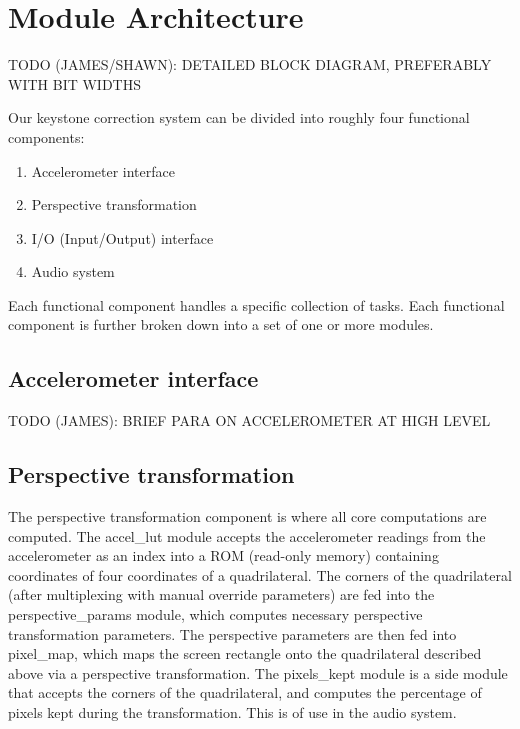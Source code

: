 \documentclass{article}
\begin{document}
\section{Module Architecture}
TODO (JAMES/SHAWN): DETAILED BLOCK DIAGRAM, PREFERABLY WITH BIT WIDTHS

Our keystone correction system can be divided into roughly four functional components:
\begin{enumerate}
\item Accelerometer interface
\item Perspective transformation
\item I/O (Input/Output) interface
\item Audio system
\end{enumerate}

Each functional component handles a specific collection of tasks. Each functional component is further broken down into a set of one or more modules. 

\subsection{Accelerometer interface}
TODO (JAMES): BRIEF PARA ON ACCELEROMETER AT HIGH LEVEL

\subsection{Perspective transformation}
The perspective transformation component is where all core computations are computed.
The accel\_lut module accepts the accelerometer readings from the accelerometer as an index into a ROM (read-only memory) containing coordinates of four coordinates of a quadrilateral.
The corners of the quadrilateral (after multiplexing with manual override parameters) are fed into the perspective\_params module, which computes necessary perspective transformation parameters.
The perspective parameters are then fed into pixel\_map, which maps the screen rectangle onto the quadrilateral described above via a perspective transformation.
The pixels\_kept module is a side module that accepts the corners of the quadrilateral, and computes the percentage of pixels kept during the transformation.
This is of use in the audio system.
\end{document}
